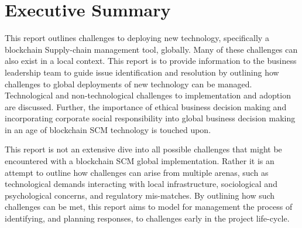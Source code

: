 \section{Executive Summary}

This report outlines challenges to deploying new technology, specifically a blockchain Supply-chain management tool, globally. Many of these challenges can also exist in a local context. This report is to provide information to the business leadership team to guide issue identification and resolution by outlining how challenges to global deployments of new technology can be managed. Technological and non-technological challenges to implementation and adoption are discussed. Further, the importance of ethical business decision making and incorporating corporate social responsibility into global business decision making in an age of blockchain SCM technology is touched upon.

This report is not an extensive dive into all possible challenges that might be encountered with a blockchain SCM global implementation. Rather it is an attempt to outline how challenges can arise from multiple arenas, such as technological demands interacting with local infrastructure, sociological and psychological concerns, and regulatory mis-matches. By outlining how such challenges can be met, this report aims to model for management the process of identifying, and planning responses, to challenges early in the project life-cycle.
